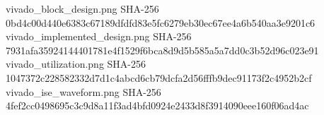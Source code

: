 \begin{codeblock}
vivado_block_design.png
SHA-256 0bd4c00d440e6383c67189dfdfd83e5fc6279eb30ec67ee4a6b540aa3e9201c6
vivado_implemented_design.png
SHA-256 7931afa35924144401781e4f1529f6bca8d9d5b585a5a7dd0c3b52d96c023e91
vivado_utilization.png
SHA-256 1047372c228582332d7d1c4abcd6cb79dcfa2d56fffb9dec91173f2c4952b2cf
vivado_ise_waveform.png
SHA-256 4fef2cc0498695c3c9d8a11f3ad4bfd0924e2433d8f3914090eee160f06ad4ac
\end{codeblock}

